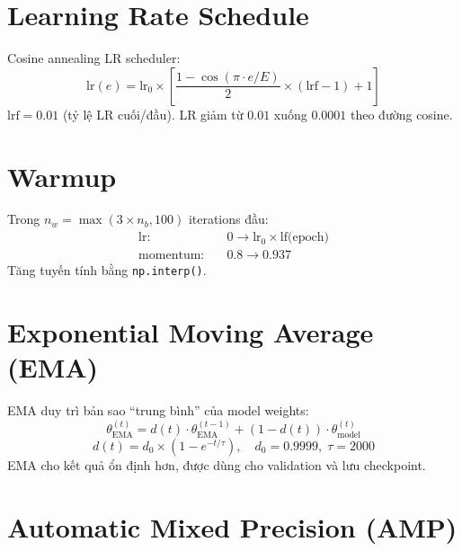 \section{Learning Rate Schedule}

Cosine annealing LR scheduler:
\begin{equation}
    \text{lr}(e) = \text{lr}_0 \times \left[\frac{1 - \cos(\pi \cdot e / E)}{2} \times (\text{lrf} - 1) + 1\right]
\end{equation}
$\text{lrf} = 0.01$ (tỷ lệ LR cuối/đầu). LR giảm từ $0.01$ xuống $0.0001$ theo đường cosine.

\section{Warmup}

Trong $n_w = \max(3 \times n_b, 100)$ iterations đầu:
\begin{align}
    \text{lr}: \quad &0 \to \text{lr}_0 \times \text{lf(epoch)} \\
    \text{momentum}: \quad &0.8 \to 0.937
\end{align}
Tăng tuyến tính bằng \texttt{np.interp()}.

\section{Exponential Moving Average (EMA)}
\label{sec:ema}

\begin{conceptbox}
EMA duy trì bản sao ``trung bình'' của model weights:
\begin{equation}
    \theta_{\text{EMA}}^{(t)} = d(t) \cdot \theta_{\text{EMA}}^{(t-1)} + (1 - d(t)) \cdot \theta_{\text{model}}^{(t)}
\end{equation}
\begin{equation}
    d(t) = d_0 \times \left(1 - e^{-t/\tau}\right), \quad d_0 = 0.9999, \; \tau = 2000
\end{equation}
EMA cho kết quả ổn định hơn, được dùng cho validation và lưu checkpoint.
\end{conceptbox}

\section{Automatic Mixed Precision (AMP)}

